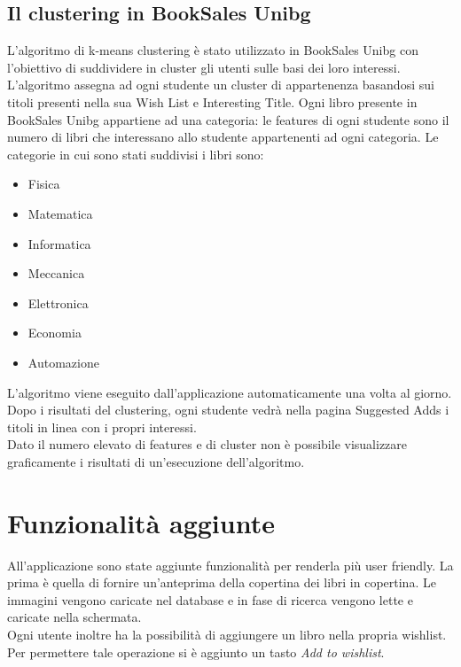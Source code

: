 \documentclass[10pt,a4paper]{report}
\begin{document}
		\subsection{Il clustering in BookSales Unibg}
		L'algoritmo di k-means clustering è stato utilizzato in BookSales Unibg con l'obiettivo di suddividere in cluster gli utenti sulle basi dei loro interessi.
		L'algoritmo assegna ad ogni studente un cluster di appartenenza basandosi sui titoli presenti nella sua Wish List e Interesting Title. Ogni libro 
		presente in BookSales Unibg appartiene ad una categoria: le features di ogni studente sono il numero di libri che interessano allo studente 
		appartenenti ad ogni categoria.
		Le categorie in cui sono stati suddivisi i libri sono:
		\begin{itemize}
			\item Fisica
			\item Matematica
			\item Informatica
			\item Meccanica
			\item Elettronica
			\item Economia
			\item Automazione
		\end{itemize}
		L'algoritmo viene eseguito dall'applicazione automaticamente una volta al giorno.
		Dopo i risultati del clustering, ogni studente vedrà nella pagina Suggested Adds i titoli in linea con i propri interessi.\\
		Dato il numero elevato di features e di cluster non è possibile visualizzare graficamente i risultati di un'esecuzione dell'algoritmo.

\section{Funzionalità aggiunte}
All'applicazione sono state aggiunte funzionalità per renderla più user friendly. La prima è quella di fornire un'anteprima della copertina dei libri in copertina. Le immagini vengono caricate nel database e in fase di ricerca vengono lette e caricate nella schermata.\\
Ogni utente inoltre ha la possibilità di aggiungere un libro nella propria wishlist. Per permettere tale operazione si è aggiunto un tasto \textit{Add to wishlist}.
\end{document}
